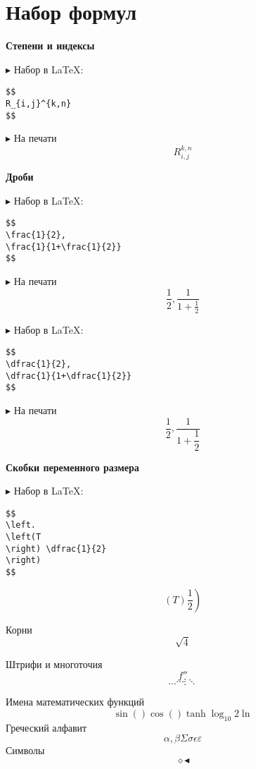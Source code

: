 \documentclass[a4paper, 14pt]{article}
\begin{document}
\fontsize{14}{18}\selectfont
\thispagestyle{empty}
\newpage
\tableofcontents
\newpage

\section{Набор формул}

\begin{center}
{\bf Степени и индексы}
\end{center}

\noindent $\blacktriangleright$ Набор в \LaTeX:
\begin{lstlisting}
$$
R_{i,j}^{k,n}
$$
\end{lstlisting}

\noindent $\blacktriangleright$ На печати 
$$
R_{i,j}^{k,n}
$$

\begin{center}
{\bf Дроби}    
\end{center}

\noindent $\blacktriangleright$ Набор в \LaTeX:
\begin{lstlisting}
$$
\frac{1}{2}, 
\frac{1}{1+\frac{1}{2}}
$$
\end{lstlisting}
\noindent $\blacktriangleright$ На печати 
$$
\frac{1}{2}, \frac{1}{1+\frac{1}{2}}
$$

\noindent $\blacktriangleright$ Набор в \LaTeX:
\begin{lstlisting}
$$
\dfrac{1}{2}, 
\dfrac{1}{1+\dfrac{1}{2}}
$$
\end{lstlisting}
\noindent $\blacktriangleright$ На печати 
$$
\dfrac{1}{2}, \dfrac{1}{1+\dfrac{1}{2}}
$$

\begin{center}
{\bf Скобки переменного размера}    
\end{center}

\noindent $\blacktriangleright$ Набор в \LaTeX:
\begin{lstlisting}
$$
\left.
\left(T
\right) \dfrac{1}{2}
\right)
$$
\end{lstlisting}

$$
\left.
\left(T
\right) \dfrac{1}{2}
\right)
$$



Корни
$$
\sqrt{4}
$$

Штрифи и многоточия
$$
f''
$$
$$
\ldots \cdots \vdots \ddots 
$$

Имена математических функций
$$
\sin() \cos() \tanh \log_{10}{2} \ln
$$
Греческий алфавит
$$\alpha, \beta \Sigma \sigma \epsilon \varepsilon$$
Символы
$$
\diamond
\blacktriangleleft
$$
\end{document}
